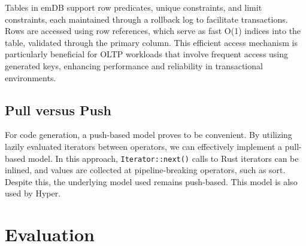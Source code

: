 \documentclass[conference]{IEEEtran}
\begin{document}
Tables in emDB support row predicates, unique constraints, and limit constraints,
each maintained through a rollback log to facilitate transactions. Rows are accessed
using row references, which serve as fast O(1) indices into the table, validated
through the primary column. This efficient access mechanism is particularly
beneficial for OLTP workloads that involve frequent access using generated keys,
enhancing performance and reliability in transactional environments.

\subsection{Pull versus Push}



For code generation, a push-based model proves to be convenient. By utilizing lazily
evaluated iterators between operators, we can effectively implement a pull-based model.
In this approach, \texttt{Iterator::next()} calls to Rust iterators can be
inlined, and values are collected at pipeline-breaking operators, such as sort.
Despite this, the underlying model used remains push-based. This model is also used
by Hyper\cite{HyperEfficientCompilation}.

\section{Evaluation}



\end{document}
